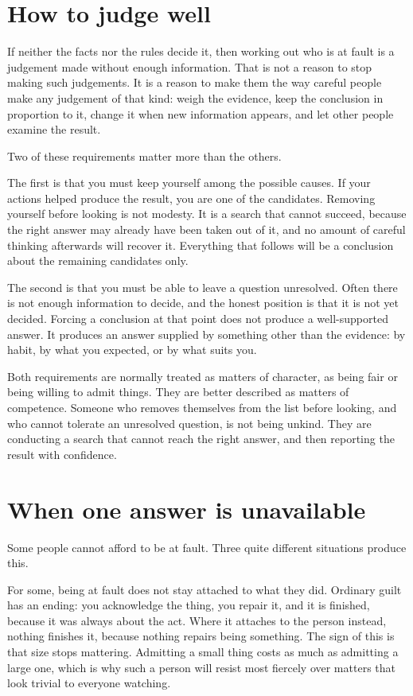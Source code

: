 \documentclass{article}
\begin{document}
\section{How to judge well}
If neither the facts nor the rules decide it, then working out who is at fault is a judgement made without enough information. That is not a reason to stop making such judgements. It is a reason to make them the way careful people make any judgement of that kind: weigh the evidence, keep the conclusion in proportion to it, change it when new information appears, and let other people examine the result.

Two of these requirements matter more than the others.

The first is that you must keep yourself among the possible causes. If your actions helped produce the result, you are one of the candidates. Removing yourself before looking is not modesty. It is a search that cannot succeed, because the right answer may already have been taken out of it, and no amount of careful thinking afterwards will recover it. Everything that follows will be a conclusion about the remaining candidates only.

The second is that you must be able to leave a question unresolved. Often there is not enough information to decide, and the honest position is that it is not yet decided. Forcing a conclusion at that point does not produce a well-supported answer. It produces an answer supplied by something other than the evidence: by habit, by what you expected, or by what suits you.

Both requirements are normally treated as matters of character, as being fair or being willing to admit things. They are better described as matters of competence. Someone who removes themselves from the list before looking, and who cannot tolerate an unresolved question, is not being unkind. They are conducting a search that cannot reach the right answer, and then reporting the result with confidence.

\section{When one answer is unavailable}
Some people cannot afford to be at fault. Three quite different situations produce this.

For some, being at fault does not stay attached to what they did. Ordinary guilt has an ending: you acknowledge the thing, you repair it, and it is finished, because it was always about the act. Where it attaches to the person instead, nothing finishes it, because nothing repairs being something. The sign of this is that size stops mattering. Admitting a small thing costs as much as admitting a large one, which is why such a person will resist most fiercely over matters that look trivial to everyone watching.
\end{document}
